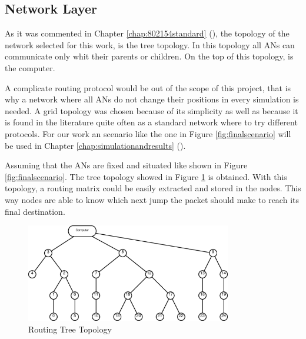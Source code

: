 \subsection{Network Layer}

As it was commented in Chapter \ref{chap:802154standard} (), the topology of the network selected for this work,
is the tree topology. In this topology all \acp{AN} can communicate only whit their parents or children. On the top of this topology, is 
the computer.

A complicate routing protocol would be out of the scope of this project, that is why a network where all \acp{AN} do not change their positions 
in every simulation is needed. A grid topology was chosen because of its simplicity as well as because it is found in the literature quite often 
as a standard network where to try different protocols. For our work an scenario like the one in Figure \ref{fig:finalscenario} will be used 
in Chapter \ref{chap:simulationandresults} ().

Assuming that the \acp{AN} are fixed and situated like shown in Figure \ref{fig:finalscenario}. The tree topology showed in Figure 
\ref{fig:routetree} is obtained. With this topology, a routing matrix could be easily extracted and stored in the nodes. This way nodes 
are able to know which next jump the packet should make to reach its final destination.

\begin{figure}[ht]
 \begin{center}
  \includegraphics[width=0.8\textwidth]{routetree.eps}
 \end{center}
 \caption{Routing Tree Topology}
 \label{fig:routetree}
\end{figure}

